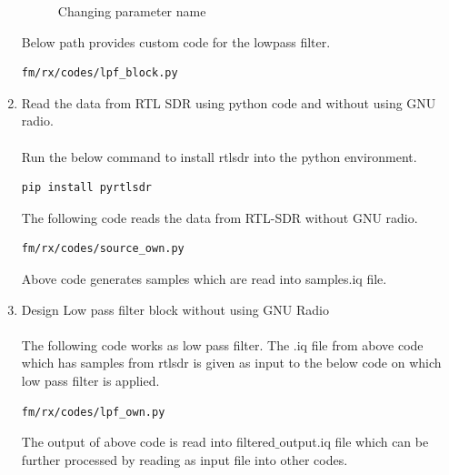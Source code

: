 \begin{enumerate}[label=\arabic*.,ref=\thesection.\theenumi]
\begin{figure}[H]
\caption{Changing parameter name}
\label{fig:changingparametername}
\end{figure}
Below path provides custom code for the lowpass filter.
\begin{lstlisting}
fm/rx/codes/lpf_block.py
\end{lstlisting} 
\item Read the data from RTL SDR using python code and without using GNU radio.
\\
\solution \\
Run the below command to install rtlsdr into the python environment.\\
\begin{lstlisting}
pip install pyrtlsdr
\end{lstlisting}
The following code reads the data from RTL-SDR without GNU radio.
\begin{lstlisting}
fm/rx/codes/source_own.py
\end{lstlisting}
Above code generates samples which are read into samples.iq file.\\
\item Design Low pass filter block without using GNU Radio
\\
\solution \\
The following code works as low pass filter. The .iq file from above code which has samples from rtlsdr is given as input to the below code on which low pass filter is applied.\\
\begin{lstlisting}
fm/rx/codes/lpf_own.py
\end{lstlisting}
The output of above code is read into filtered$\_$output.iq file which can be further processed by reading as input file into other codes. 
\end{enumerate}